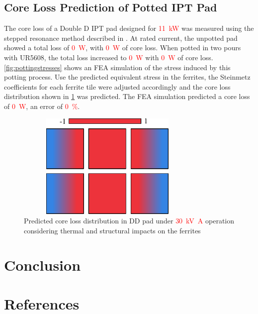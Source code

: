 \documentclass[conference]{IEEEtran}
\begin{document}
\subsection{Core Loss Prediction of Potted IPT Pad}
The core loss of a Double D IPT pad designed for \textcolor{red}{\SI{11}{\kilo\watt}} was measured using the stepped resonance method described in \cite{kalraPowerLossMeasurement2020}.
At rated current, the unpotted pad showed a total loss of \textcolor{red}{\SI{0}{\watt}}, with \textcolor{red}{\SI{0}{\watt}} of core loss.
When potted in two pours with UR5608, the total loss increased to \textcolor{red}{\SI{0}{\watt}} with \textcolor{red}{\SI{0}{\watt}} of core loss. 
\cref{fig:pottingstresses} shows an FEA simulation of the stress induced by this potting process. 
Use the predicted equivalent stress in the ferrites, the Steinmetz coefficients for each ferrite tile were adjusted accordingly and the core loss distribution shown in \cref{fig:padcoreloss} was predicted. 
The FEA simulation predicted a core loss of \textcolor{red}{\SI{0}{\watt}}, an error of \textcolor{red}{\SI{0}{\percent}}. 
\begin{figure}[t]
  \includegraphics[width=3.5in, height=2in]{figures/simulatedpottingpadstresses.pdf}
  \caption{Predicted core loss distribution in DD pad under \textcolor{red}{\SI{30}{\kilo\volt\ampere}} operation considering thermal and structural impacts on the ferrites}
  \label{fig:padcoreloss}
\end{figure}

\section{Conclusion}

\section*{References}
\printbibliography[heading=none]
\end{document}
